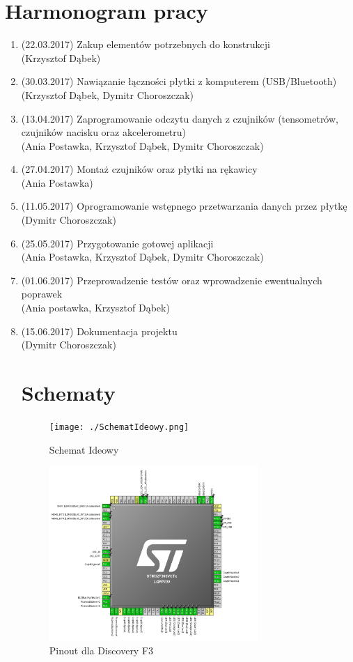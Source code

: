 \documentclass[12pt,a4paper]{article}
\begin{document}
\section{Harmonogram pracy}
\begin{enumerate}
\item (22.03.2017) Zakup elementów potrzebnych do konstrukcji \\(Krzysztof Dąbek)
\item (30.03.2017) Nawiązanie łączności płytki z komputerem (USB/Bluetooth) \\(Krzysztof Dąbek, Dymitr Choroszczak)
\item (13.04.2017) Zaprogramowanie odczytu danych z czujników (tensometrów, czujników nacisku oraz akcelerometru) \\(Ania Postawka, Krzysztof Dąbek, Dymitr Choroszczak) 
\item (27.04.2017) Montaż czujników oraz płytki na rękawicy \\(Ania Postawka)
\item (11.05.2017) Oprogramowanie wstępnego przetwarzania danych przez płytkę \\(Dymitr Choroszczak) 
\item (25.05.2017) Przygotowanie gotowej aplikacji \\(Ania Postawka, Krzysztof Dąbek, Dymitr Choroszczak)
\item (01.06.2017) Przeprowadzenie testów oraz wprowadzenie ewentualnych poprawek \\(Ania postawka, Krzysztof Dąbek)
\item (15.06.2017) Dokumentacja projektu \\(Dymitr Choroszczak)

\section{Schematy}
\begin{figure}[!htb]
\texttt{[image: ./SchematIdeowy.png]}
\caption{Schemat Ideowy}
\end{figure}
\begin{figure}[!htb]
\centering
\includegraphics[width=0.75\textwidth]{./pinout.png}
\caption{Pinout dla Discovery F3}
\end{figure}
\end{enumerate}
\end{document}
